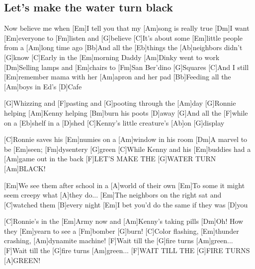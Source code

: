 \subsection*{Let's make the water turn black   }
\begin{guitar}
[C]Now believe me when [Em]I tell you that my [Am]song is really true
[Dm]I want [Em]everyone to [Fm]listen and [G]believe
[C]It's about some [Em]little people from a [Am]long time ago
[Bb]And all the [Eb]things the [Ab]neighbors didn't [G]know
[C]Early in the [Em]morning Daddy [Am]Dinky went to work
[Dm]Selling lamps and [Em]chairs to [Fm]San Ber'dino [G]Squares
[C]And I still [Em]remember mama with her [Am]apron and her pad
[Bb]Feeding all the [Am]boys in Ed's [D]Cafe



[G]Whizzing and [F]pasting and [G]pooting through the [Am]day
[G]Ronnie helping [Am]Kenny helping [Bm]burn his poots [D]away
[G]And all the [F]while on a [Eb]shelf in a [D]shed
[C]Kenny's little creature's [Ab]on [G]display



[C]Ronnie saves his [Em]numies on a [Am]window in his room
[Dm]A marvel to be [Em]seen; [Fm]dysentery [G]green
[C]While Kenny and his [Em]buddies had a [Am]game out in the back
[F]LET'S MAKE THE [G]WATER TURN [Am]BLACK!



[Em]We see them after school in a [A]world of their own
[Em]To some it might seem creepy what [A]they do...
[Em]The neighbors on the right sat and [C]watched them [B]every night
[Em]I bet you'd do the same if they was [D]you



[C]Ronnie's in the [Em]Army now and [Am]Kenny's taking pills
[Dm]Oh! How they [Em]yearn to see a [Fm]bomber [G]burn!
[C]Color flashing, [Em]thunder crashing, [Am]dynamite machine!
[F]Wait till the [G]fire turns [Am]green...
[F]Wait till the [G]fire turns [Am]green...
[F]WAIT TILL THE [G]FIRE TURNS [A]GREEN!

\end{guitar}
